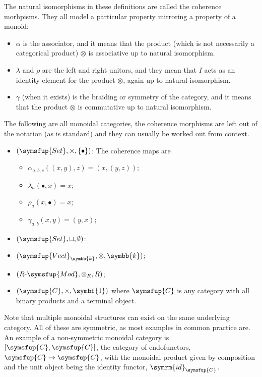 \documentclass[fleqn]{NotesClass}
\makeatletter
\newcommand{\cat}[1]{\symsfup{#1}}
\newcommand{\terminal}{\symbf{1}}
\newcommand{\c@egory}[1]{\symsfup{#1}}
\newcommand{\Set}{\c@egory{Set}}
\newcommand{\Vect}[1][\field]{\c@egory{Vect}_{#1}}
\newcommand{\RMod}[1][R]{#1\text{-}\c@egory{Mod}}
\newcommand{\id}{\symrm{id}}
\renewcommand{\field}{\symbb{k}}
\makeatother
\begin{document}
    The natural isomorphisms in these definitions are called the coherence morhpisms.
    They all model a particular property mirroring a property of a monoid:
    \begin{itemize}
        \item \(\alpha\) is the associator, and it means that the product (which is not necessarily a categorical product) \(\otimes\) is associative up to natural isomorphism.
        \item \(\lambda\) and \(\rho\) are the left and right unitors, and they mean that \(I\) acts as an identity element for the product \(\otimes\), again up to natural isomorphism.
        \item \(\gamma\) (when it exists) is the braiding or symmetry of the category, and it means that the product \(\otimes\) is commutative up to natural isomorphism.
    \end{itemize}
    
    \begin{exm}{}{}
        The following are all monoidal categories, the coherence morphisms are left out of the notation (as is standard) and they can usually be worked out from context.
        \begin{itemize}
            \item \((\Set, \times, \{\bullet\})\):
            The coherence maps are
            \begin{itemize}
                \item \(\alpha_{a,b,c}((x,y),z) = (x,(y,z))\);
                \item \(\lambda_a(\bullet, x) = x\);
                \item \(\rho_a(x, \bullet) = x\);
                \item \(\gamma_{a,b}(x,y) = (y,x)\);
            \end{itemize}
            \item \((\Set, \sqcup, \emptyset)\):
            \item \((\Vect, \otimes, \field)\);
            \item \((\RMod, \otimes_R, R)\);
            \item \((\cat{C}, \times, \terminal)\) where \(\cat{C}\) is any category with all binary products and a terminal object.
        \end{itemize}
        Note that multiple monoidal structures can exist on the same underlying category.
        All of these are symmetric, as most examples in common practice are.
        An example of a non-symmetric monoidal category is \([\cat{C}, \cat{C}]\), the category of endofunctors, \(\cat{C} \to \cat{C}\), with the monoidal product given by composition and the unit object being the identity functor, \(\id_{\cat{C}}\).
    \end{exm}
    
\end{document}
